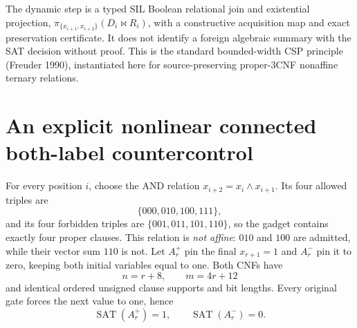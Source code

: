 \documentclass[11pt]{article}
\begin{document}
The dynamic step is a typed SIL Boolean relational join and existential projection, $\pi_{\{x_{i+1},x_{i+2}\}}(D_i\Join R_i)$, with a constructive acquisition map and exact preservation certificate. It does not identify a foreign algebraic summary with the SAT decision without proof. This is the standard bounded-width CSP principle (Freuder 1990), instantiated here for source-preserving proper-3CNF nonaffine ternary relations.

\section{An explicit nonlinear connected both-label countercontrol}
For every position $i$, choose the AND relation $x_{i+2}=x_i\land x_{i+1}$. Its four allowed triples are
\[
 \{000,010,100,111\},
\]
and its four forbidden triples are $\{001,011,101,110\}$, so the gadget contains exactly four proper clauses. This relation is \emph{not affine}: $010$ and $100$ are admitted, while their vector sum $110$ is not. Let $A_r^+$ pin the final $x_{r+1}=1$ and $A_r^-$ pin it to zero, keeping both initial variables equal to one. Both CNFs have
\[
 n=r+8,\qquad m=4r+12
\]
and identical ordered unsigned clause supports and bit lengths. Every original gate forces the next value to one, hence
\[
 \operatorname{SAT}(A_r^+)=1,\qquad
 \operatorname{SAT}(A_r^-)=0.
\]
\end{document}
